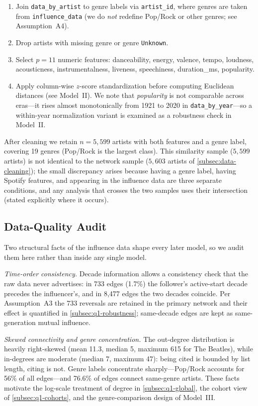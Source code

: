 \begin{enumerate}
  \item Join \texttt{data\_by\_artist} to genre labels via
        \texttt{artist\_id}, where genres are taken from
        \texttt{influence\_data} (we do \emph{not} redefine Pop/Rock or
        other genres; see Assumption~A4).
  \item Drop artists with missing genre or genre \texttt{Unknown}.
  \item Select $p=11$ numeric features: danceability, energy, valence,
        tempo, loudness, acousticness, instrumentalness, liveness,
        speechiness, duration\_ms, popularity.
  \item Apply column-wise $z$-score standardization before computing
        Euclidean distances (see Model~II). We note that
        \emph{popularity} is not comparable across eras---it rises almost
        monotonically from 1921 to 2020 in \texttt{data\_by\_year}---so a
        within-year normalization variant is examined as a robustness check
        in Model~II.
\end{enumerate}
After cleaning we retain $n=5{,}599$ artists with both features and a genre
label, covering 19 genres (Pop/Rock is the largest class). This similarity
sample ($5{,}599$ artists) is not identical to the network sample
($5{,}603$ artists of \cref{subsec:data-cleaning}); the small discrepancy
arises because having a genre label, having Spotify features, and appearing
in the influence data are three separate conditions, and any analysis that
crosses the two samples uses their intersection (stated explicitly where it
occurs).

\subsection{Data-Quality Audit}\label{subsec:data-audit}

Two structural facts of the influence data shape every later model, so we
audit them here rather than inside any single model.

\emph{Time-order consistency.} Decade information allows a consistency
check that the raw data never advertises: in 733 edges (1.7\%) the
follower's active-start decade precedes the influencer's, and in 8{,}477
edges the two decades coincide. Per Assumption~A3 the 733 reversals are
retained in the primary network and their effect is quantified in
\cref{subsec:q1-robustness}; same-decade edges are kept as same-generation
mutual influence.

\emph{Skewed connectivity and genre concentration.} The out-degree
distribution is heavily right-skewed (mean 11.3, median 5, maximum 615 for
The Beatles), while in-degrees are moderate (median 7, maximum 47): being
cited is bounded by list length, citing is not. Genre labels concentrate
sharply---Pop/Rock accounts for 56\% of all edges---and 76.6\% of edges
connect same-genre artists. These facts motivate the log-scale treatment of
degree in \cref{subsec:q1-global}, the cohort view of
\cref{subsec:q1-cohorts}, and the genre-comparison design of Model~III.
